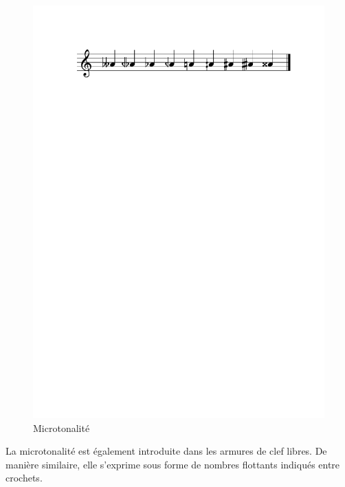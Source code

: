\documentclass{article}
\begin{document}
\begin{figure}[h]
\centering
\includegraphics[width=\columnwidth]{img/partitions/alter.pdf}
\caption{Microtonalité}
\label{fig:alter}
\end{figure}

La microtonalité est également introduite dans les armures de clef libres. De manière similaire, elle s'exprime sous forme de nombres flottants indiqués entre crochets.
\end{document}
